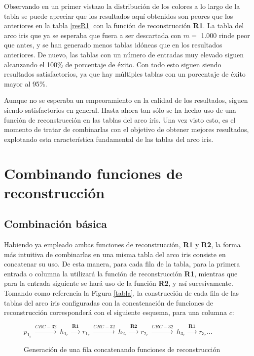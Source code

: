 \documentclass[12pt,spanish,listoffigures,listoftables,listofalgorithms]{tfgetsinf}
\begin{document}
Observando en un primer vistazo la distribución de los colores a lo largo de la tabla se puede apreciar que los resultados aquí obtenidos son peores que los anteriores en la tabla \ref{resR1} con la función de reconstrucción \textbf{R1}. La tabla del arco iris que ya se esperaba que fuera a ser descartada con $m =$ 1.000 rinde peor que antes, y se han generado menos tablas idóneas que en los resultados anteriores. De nuevo, las tablas con un número de entradas muy elevado siguen alcanzando el 100\% de porcentaje de éxito. Con todo esto siguen siendo resultados satisfactorios, ya que hay múltiples tablas con un porcentaje de éxito mayor al 95\%.

Aunque no se esperaba un empeoramiento en la calidad de los resultados, siguen siendo satisfactorios en general. Hasta ahora tan sólo se ha hecho uso de una función de reconstrucción en las tablas del arco iris. Una vez visto esto, es el momento de tratar de combinarlas con el objetivo de obtener mejores resultados, explotando esta característica fundamental de las tablas del arco iris.

\section{Combinando funciones de reconstrucción}

\subsection{Combinación básica}

Habiendo ya empleado ambas funciones de reconstrucción, \textbf{R1} y \textbf{R2}, la forma más intuitiva de combinarlas en una misma tabla del arco iris consiste en concatenar su uso. De esta manera, para cada fila de la tabla, para la primera entrada o columna la utilizará la función de reconstrucción \textbf{R1}, mientras que para la entrada siguiente se hará uso de la función \textbf{R2}, y así sucesivamente. Tomando como referencia la Figura \ref{tabla}, la construcción de cada fila de las tablas del arco iris configuradas con la concatenación de funciones de reconstrucción corresponderá con el siguiente esquema, para una columna $c$:

 \begin{figure}[H]

	\centering

	$p_{1_c}~ \xrightarrow{CRC-32}~ h_{1_c}~ \xrightarrow{\textbf{R1}}~ r_{1_c}~ \xrightarrow{CRC-32}~ h_{2_c}~ \xrightarrow{\textbf{R2}}~ r_{2_c}~ \xrightarrow{CRC-32}~ h_{3_c}~ \xrightarrow{\textbf{R1}}~ r_{3_c} \dots$ \\

	\caption{Generación de una fila concatenando funciones de reconstrucción}
	\label{filaR1R2}
	 
 \end{figure}
\end{document}

